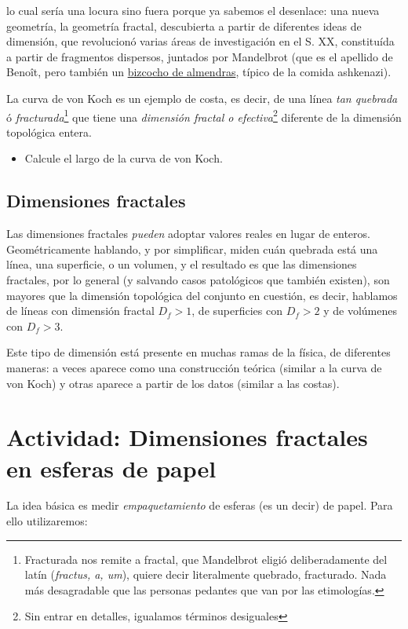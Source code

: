 \documentclass[10pt,a4paper]{article}
\numberwithin{equation}{section}
\begin{document}
\noindent lo cual sería una locura sino fuera porque ya sabemos el desenlace: una nueva geometría, la geometría fractal, descubierta a partir de diferentes ideas de dimensión, que revolucionó varias áreas de investigación en el S. XX, constituída a partir de fragmentos dispersos, juntados por Mandelbrot (que es el apellido de Benoît, pero también un \href{https://www.thespruceeats.com/jewish-mandelbrot-recipe-1136149}{bizcocho de almendras}, típico de la comida ashkenazi).

La curva de von Koch es un ejemplo de costa, es decir, de una línea \textit{tan quebrada} ó \textit{fracturada}\footnote{Fracturada nos remite a fractal, que Mandelbrot eligió deliberadamente del latín (\textit{fractus, a, um}), quiere decir literalmente quebrado, fracturado. Nada más desagradable que las personas pedantes que van por las etimologías.} que tiene una \textit{dimensión fractal o efectiva}\footnote{Sin entrar en detalles, igualamos términos desiguales} diferente de la dimensión topológica entera.

\begin{itemize}
\item[$\bullet$] Calcule el largo de la curva de von Koch.
\end{itemize} 


\subsection{Dimensiones fractales}

Las dimensiones fractales \textit{pueden} adoptar valores reales en lugar de enteros. Geométricamente hablando, y por simplificar, miden cuán quebrada está una línea, una superficie, o un volumen, y el resultado es que las dimensiones fractales, por lo general (y salvando casos patológicos que también existen), son mayores que la dimensión topológica del conjunto en cuestión, es decir, hablamos de líneas con dimensión fractal $D_f > 1$, de superficies con $D_f > 2$ y de volúmenes con $D_f > 3$. 

Este tipo de dimensión está presente en muchas ramas de la física, de diferentes maneras: a veces aparece como una construcción teórica (similar a la curva de von Koch) y otras aparece a partir de los datos (similar a las costas). 

\pagebreak
\section{Actividad: Dimensiones fractales en esferas de papel}
La idea básica es medir \textit{empaquetamiento} de esferas (es un decir) de papel. Para ello utilizaremos:
\end{document}
